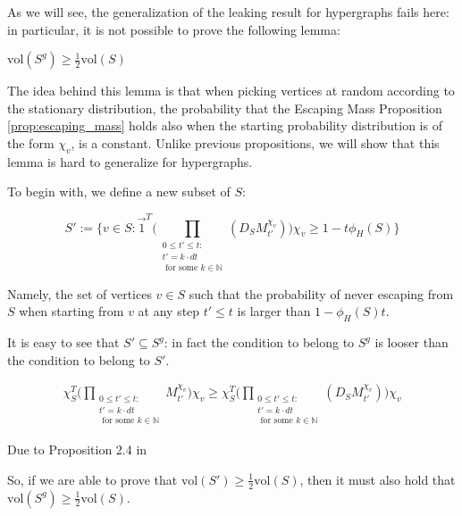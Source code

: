 \documentclass[../main.tex]{subfiles}
\begin{document}
    As we will see, the generalization of the leaking result for hypergraphs fails here: in particular, it is not possible to prove the following lemma:
    
    \begin{lemma} \label{lemma:volume_of_S_g}
        $\text{vol}(S^g) \geq \frac{1}{2} \text{vol}(S)$
    \end{lemma}
    
    The idea behind this lemma is that when picking vertices at random according to the stationary distribution, the probability that the Escaping Mass Proposition \ref{prop:escaping_mass} holds also when the starting probability distribution is of the form $\chi_v$, is a constant. Unlike previous propositions, we will show that this lemma is hard to generalize for hypergraphs.
    
    To begin with, we define a new subset of $S$:
    
    \begin{equation}
        S' := \bigg\{v\in S : \vec{1}^T \bigg(\prod_{\substack{0 \leq t'\leq t:\\ t' = k\cdot dt\\ \text{ for some }k\in \mathbb{N}}}(D_S M_{t'}^{\chi_v})\bigg) \chi_v \geq 1 - t \phi_H(S) \bigg\}
    \end{equation}
    
    Namely, the set of vertices $v\in S$ such that the probability of never escaping from $S$ when starting from $v$ at any step $t'\leq t$ is larger than $1-\phi_H(S) t$.
    
    It is easy to see that $S' \subseteq S^g$: in fact the condition to belong to $S^g$ is looser than the condition to belong to $S'$.
    
     \begin{align}
        \chi_{S}^T \bigg(\prod_{\substack{0 \leq t'\leq t:\\ t' = k\cdot dt\\ \text{ for some }k\in \mathbb{N}}} M_{t'}^{\chi_v}\bigg) \chi_v \geq \chi_S^T \bigg(\prod_{\substack{0 \leq t'\leq t:\\ t' = k\cdot dt\\ \text{ for some }k\in \mathbb{N}}}(D_S M_{t'}^{\chi_v})\bigg) \chi_v
    \end{align}
    
    Due to Proposition 2.4 in \cite{SpielmanClustering}
    
    So, if we are able to prove that $\text{vol}(S')\geq \frac{1}{2}\text{vol}(S)$, then it must also hold that $\text{vol}(S^g)\geq \frac{1}{2}\text{vol}(S)$.
    
\end{document}

